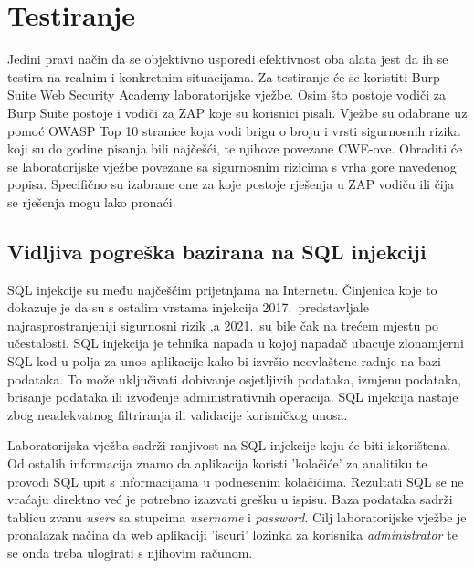 \chapter{Testiranje}
Jedini pravi način da se objektivno usporedi efektivnost oba alata jest da ih se testira na realnim i konkretnim situacijama. Za testiranje će se koristiti Burp Suite Web Security Academy laboratorijske vježbe.\cite{burp_labs}
Osim što postoje vodiči za Burp Suite postoje i vodiči za ZAP koje su korisnici pisali.\cite{owasp_2fa_manual,owasp_b-f_manual}
Vježbe su odabrane uz pomoć OWASP Top 10 stranice\cite{owasp_top10} koja vodi brigu o broju i vrsti sigurnosnih rizika koji su do godine pisanja bili najčešći, 
te njihove povezane CWE-ove.
Obraditi će se laboratorijske vježbe povezane sa sigurnosnim rizicima s vrha gore navedenog popisa. Specifično su izabrane one za koje postoje rješenja u ZAP vodiču ili čija se rješenja mogu lako pronaći.
\section{Vidljiva pogreška bazirana na SQL injekciji}
SQL injekcije su među najčešćim prijetnjama na Internetu. Činjenica koje to dokazuje je da su s ostalim vrstama injekcija 2017.\ predstavljale najrasprostranjeniji sigurnosni rizik ,a 2021.\ su bile čak 
na trećem mjestu po učestalosti.\cite{owasp_top10}
SQL injekcija je tehnika napada u kojoj napadač ubacuje zlonamjerni SQL kod u polja za unos aplikacije kako bi izvršio neovlaštene radnje na bazi podataka. To 
može uključivati dobivanje osjetljivih podataka, izmjenu podataka, brisanje podataka ili izvođenje administrativnih operacija. 
SQL injekcija nastaje zbog neadekvatnog filtriranja ili validacije korisničkog unosa.\cite{clarke_sql,sql_w3}

Laboratorijska vježba sadrži ranjivost na SQL injekcije koju će biti iskorištena. Od ostalih informacija znamo da aplikacija koristi 'kolačiće' za analitiku te provodi SQL upit 
s informacijama u podnesenim kolačićima. Rezultati SQL se ne vraćaju direktno već je potrebno izazvati grešku u ispisu. Baza podataka sadrži tablicu zvanu \textit{users} sa stupcima \textit{username} i \textit{password}.
Cilj laboratorijske vježbe je pronalazak načina da web aplikaciji 'iscuri' lozinka za korisnika \textit{administrator} te se onda treba ulogirati s njihovim računom.

